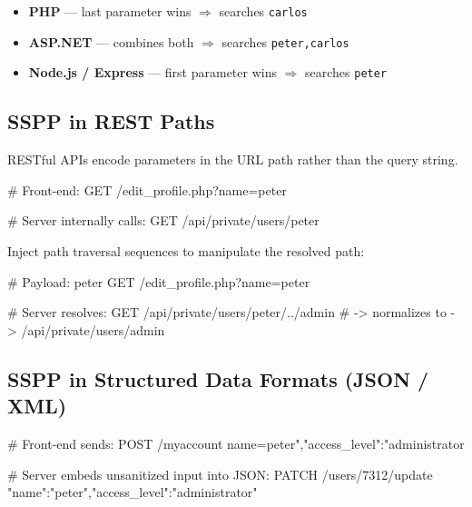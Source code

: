 \documentclass[11pt]{article}
\begin{document}
\begin{notebox}
\begin{itemize}
  \item \textbf{PHP} --- last parameter wins $\Rightarrow$ searches \texttt{carlos}
  \item \textbf{ASP.NET} --- combines both $\Rightarrow$ searches \texttt{peter,carlos}
  \item \textbf{Node.js / Express} --- first parameter wins $\Rightarrow$ searches \texttt{peter}
\end{itemize}
\end{notebox}

\subsection{SSPP in REST Paths}

RESTful APIs encode parameters in the URL path rather than the query string.

\begin{httpbox}
# Front-end:
GET /edit_profile.php?name=peter

# Server internally calls:
GET /api/private/users/peter
\end{httpbox}

Inject path traversal sequences to manipulate the resolved path:

\begin{httpbox}
# Payload: peter%
GET /edit_profile.php?name=peter%

# Server resolves:
GET /api/private/users/peter/../admin
# -> normalizes to -> /api/private/users/admin
\end{httpbox}

\subsection{SSPP in Structured Data Formats (JSON / XML)}

\begin{httpbox}
# Front-end sends:
POST /myaccount
name=peter","access_level":"administrator

# Server embeds unsanitized input into JSON:
PATCH /users/7312/update
{"name":"peter","access_level":"administrator"}
\end{httpbox}
\end{document}
